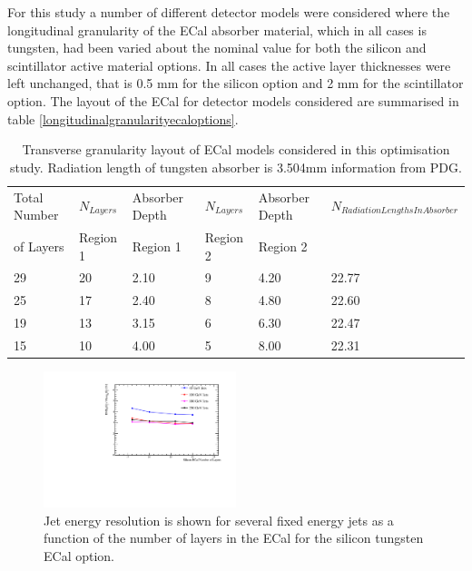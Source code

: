 For this study a number of different detector models were considered where the longitudinal granularity of the ECal absorber material, which in all cases is tungsten, had been varied about the nominal value for both the silicon and scintillator active material options.  In all cases the active layer thicknesses were left unchanged, that is 0.5 mm for the silicon option and 2 mm for the scintillator option.  The layout of the ECal for detector models considered are summarised in table \ref{longitudinalgranularityecaloptions}.

 \begin{table}[h!]
\centering
\begin{tabular}{ l l l l l l}
\hline
Total Number & $N_{Layers}$ & Absorber Depth & $N_{Layers}$ & Absorber Depth & $N_{Radiation Lengths In Absorber}$ \\
of Layers & Region 1 & Region 1 & Region 2 &  Region 2 & \\
\hline
29 & 20 & 2.10 & 9 & 4.20 & 22.77 \\
25 & 17 & 2.40 & 8 & 4.80 & 22.60 \\
19 & 13 & 3.15 & 6 & 6.30 & 22.47 \\
15 & 10 & 4.00 & 5 & 8.00 & 22.31\\
\hline
\end{tabular}
\caption[Transverse granularity layout of ECal models considered in this optimisation study.]{Transverse granularity layout of ECal models considered in this optimisation study.  Radiation length of tungsten absorber is 3.504mm information from PDG.}
\label{table:longitudinalgranularityecaloptions}
\end{table}

\iffalse

\begin{figure}
  \includegraphics[width=0.5\textwidth]{OptimisationStudies/Plots/JetEnergyResolutions/JER_vs_SiliconECalNumberofLayers.pdf}
  \caption[Jet energy resolution as a function of the number of layers in the ECal for the silicon tungsten ECal option.]{Jet energy resolution is shown for several fixed energy jets as a function of the number of layers in the ECal for the silicon tungsten ECal option.}
  \label{optstud:fig:siecallayers}
\end{figure}

